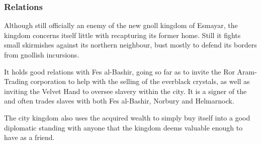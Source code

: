 
\subsubsection{Relations}

Although still officially an enemy of the new gnoll kingdom of Esmayar, the
kingdom concerns itself little with recapturing its former home. Still it
fights small skirmishes against its northern neighbour, bust mostly to
defend its borders from gnollish incursions.

It holds good relations with Fes al-Bashir, going so far as to invite the Ror
Aram-Trading corporation to help with the selling of the everblack crystals,
as well as inviting the Velvet Hand to oversee slavery within the city. It is
a signer of the  and often trades slaves with both
Fes al-Bashir, Norbury and Helmarnock.

The city kingdom also uses the acquired wealth to simply buy itself into
a good diplomatic standing with anyone that the kingdom deems valuable enough
to have as a friend.
